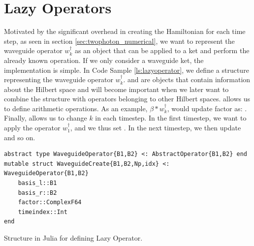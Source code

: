 \section{Lazy Operators\label{sec:lazyoperators}}
Motivated by the significant overhead in creating the Hamiltonian for each time step, as seen in section \ref{sec:twophoton_numerical}, we want to represent the waveguide operator $w_k^\dagger$ as an object that can be applied to a ket and perform the already known operation. If we only consider a waveguide ket, the implementation is simple. In Code Sample \ref{ls:lazyoperator}, we define a structure representing the waveguide operator $w_k^\dagger$.  and  are objects that contain information about the Hilbert space and will become important when we later want to combine the structure with operators belonging to other Hilbert spaces.  allows us to define arithmetic operations. As an example, $\beta * w_k^\dagger$, would update factor as: . Finally,  allows us to change $k$ in each timestep. In the first timestep, we want to apply the operator $w_1^\dagger$, and we thus set . In the next timestep, we then update  and so on.

\begin{listing}[H]
\begin{verbatim}
abstract type WaveguideOperator{B1,B2} <: AbstractOperator{B1,B2} end
mutable struct WaveguideCreate{B1,B2,Np,idx} <: WaveguideOperator{B1,B2}
    basis_l::B1
    basis_r::B2
    factor::ComplexF64
    timeindex::Int
end
\end{verbatim}
\caption{Structure in Julia for defining Lazy Operator.}
\label{ls:lazyoperator}
\end{listing}

